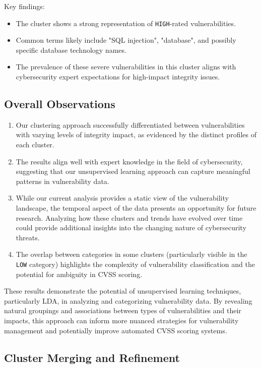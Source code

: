 Key findings:
\begin{itemize}
	\item The cluster shows a strong representation of \texttt{HIGH}-rated vulnerabilities.
	\item Common terms likely include "SQL injection", "database", and possibly specific database technology names.
	\item The prevalence of these severe vulnerabilities in this cluster aligns with cybersecurity expert expectations for high-impact integrity issues.
\end{itemize}

\subsection{Overall Observations}

\begin{enumerate}
	\item Our clustering approach successfully differentiated between vulnerabilities with varying levels of integrity impact, as evidenced by the distinct profiles of each cluster.

	\item The results align well with expert knowledge in the field of cybersecurity, suggesting that our unsupervised learning approach can capture meaningful patterns in vulnerability data.

	\item While our current analysis provides a static view of the vulnerability landscape, the temporal aspect of the data presents an opportunity for future research. Analyzing how these clusters and trends have evolved over time could provide additional insights into the changing nature of cybersecurity threats.

	\item The overlap between categories in some clusters (particularly visible in the \texttt{LOW} category) highlights the complexity of vulnerability classification and the potential for ambiguity in CVSS scoring.
\end{enumerate}

These results demonstrate the potential of unsupervised learning techniques, particularly LDA, in analyzing and categorizing vulnerability data. By revealing natural groupings and associations between types of vulnerabilities and their impacts, this approach can inform more nuanced strategies for vulnerability management and potentially improve automated CVSS scoring systems.
\subsection{Cluster Merging and Refinement}

